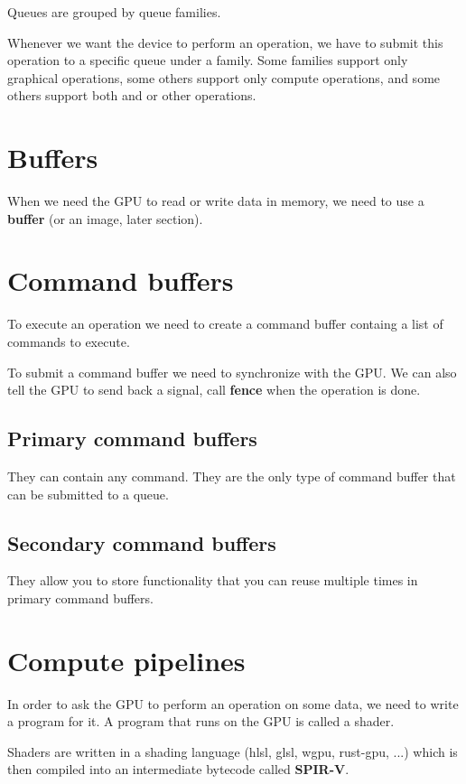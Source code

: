 \documentclass{article}
\begin{document}
Queues are grouped by queue families.

Whenever we want the device to perform an operation,
we have to submit this operation to a specific queue under a family.
Some families support only graphical operations,
some others support only compute operations, and some others support both
and or other operations.

\section{Buffers}

When we need the GPU to read or write data in memory,
we need to use a \textbf{buffer} (or an image, later section).

\section{Command buffers}

To execute an operation we need to create a command buffer
containg a list of commands to execute.

To submit a command buffer we need to synchronize with the GPU.
We can also tell the GPU to send back a signal, call \textbf{fence} when
the operation is done.

\subsection{Primary command buffers}

They can contain any command.
They are the only type of command buffer that can be submitted to a queue.

\subsection{Secondary command buffers}

They allow you to store functionality that you can reuse multiple times in primary command buffers. 

\section{Compute pipelines}

In order to ask the GPU to perform an operation on some data, we need to write
a program for it. A program that runs on the GPU is called a shader.

Shaders are written in a shading language (hlsl, glsl, wgpu, rust-gpu, ...)
which is then compiled into an intermediate bytecode called \textbf{SPIR-V}.
\end{document}

